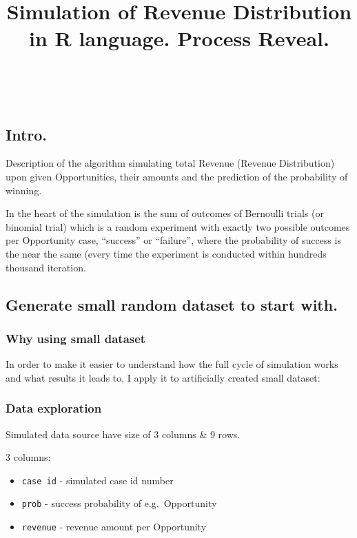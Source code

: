 \documentclass[]{article}
\title{Simulation of Revenue Distribution in R language. Process Reveal.}
\author{}
\date{}
\providecommand{\tightlist}{%
  \setlength{\itemsep}{0pt}\setlength{\parskip}{0pt}}
\begin{document}
\maketitle

{
\setcounter{tocdepth}{4}
\tableofcontents
}
~

\hypertarget{intro.}{%
\subsection{Intro.}\label{intro.}}

Description of the algorithm simulating total Revenue (Revenue
Distribution) upon given Opportunities, their amounts and the prediction
of the probability of winning.

In the heart of the simulation is the sum of outcomes of Bernoulli
trials (or binomial trial) which is a random experiment with exactly two
possible outcomes per Opportunity case, ``success'' or ``failure'',
where the probability of success is the near the same (every time the
experiment is conducted within hundreds thousand iteration.

\hypertarget{generate-small-random-dataset-to-start-with.}{%
\subsection{Generate small random dataset to start
with.}\label{generate-small-random-dataset-to-start-with.}}

\hypertarget{why-using-small-dataset}{%
\subsubsection{Why using small dataset}\label{why-using-small-dataset}}

In order to make it easier to understand how the full cycle of
simulation works and what results it leads to, I apply it to
artificially created small dataset:

\hypertarget{data-exploration}{%
\subsubsection{Data exploration}\label{data-exploration}}

Simulated data source have size of 3 columns \& 9 rows.

3 columns:

\begin{itemize}
\tightlist
\item
  \texttt{case\ id} - simulated case id number
\item
  \texttt{prob} - success probability of e.g.~Opportunity
\item
  \texttt{revenue} - revenue amount per Opportunity
\end{itemize}
\end{document}
